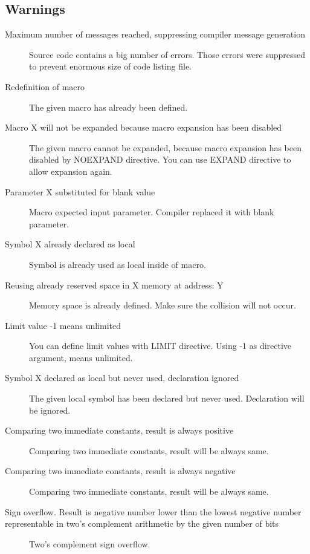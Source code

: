     \subsection{Warnings}
        \begin{description}
            \item[Maximum number of messages reached, suppressing compiler message generation]
                Source code contains a big number of errors. Those errors were suppressed to prevent enormous size of code listing file.
            \item[Redefinition of macro ]
                The given macro has already been defined.
            \item[Macro X will not be expanded because macro expansion has been disabled]
                The given macro cannot be expanded, because macro expansion has been disabled by NOEXPAND directive. You can use EXPAND directive to allow expansion again.
            \item[Parameter X substituted for blank value ]
                Macro expected input parameter. Compiler replaced it with blank parameter.
            \item[Symbol X already declared as local ]
                Symbol is already used as local inside of macro.
            \item[Reusing already reserved space in X memory at address: Y]
                Memory space is already defined. Make sure the collision will not occur.
            \item[Limit value -1 means unlimited]
                You can define limit values with LIMIT directive. Using -1 as directive argument, means unlimited.
            \item[Symbol X declared as local but never used, declaration ignored]
                The given local symbol has been declared but never used. Declaration will be ignored.
            \item[Comparing two immediate constants, result is always positive]
                Comparing two immediate constants, result will be always same.
            \item[Comparing two immediate constants, result is always negative]
                Comparing two immediate constants, result will be always same.
            \item[Sign overflow. Result is negative number lower than the lowest negative number representable in two's         complement arithmetic by the given number of bits ]
                Two's complement sign overflow.

\end{description}

